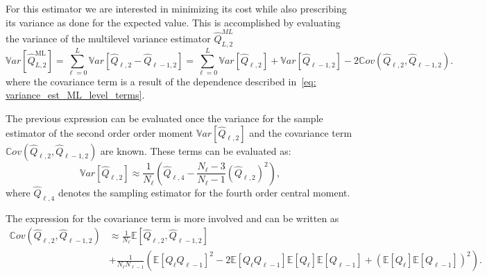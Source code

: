 For this estimator we are interested in minimizing its cost while also prescribing its variance as done for the expected value. This is accomplished by evaluating the 
variance of the multilevel variance estimator $\hat{Q}_{L,2}^{ML}$
\begin{equation}
 \mathbb{V}ar\left[ \hat{Q}_{L,2}^{\mathrm{ML}} \right] = \sum_{\ell=0}^L \mathbb{V}ar\left[ \hat{Q}_{\ell,2} - \hat{Q}_{\ell-1,2} \right]
                                               = \sum_{\ell=0}^L \mathbb{V}ar\left[ \hat{Q}_{\ell,2} \right] + \mathbb{V}ar\left[\hat{Q}_{\ell-1,2} \right]
                                               - 2 \mathbb{C}ov\left( \hat{Q}_{\ell,2},\hat{Q}_{\ell-1,2} \right).
\end{equation}
where the covariance term is a result of the dependence described in~\eqref{eq: variance_est_ML_level_terms}.

The previous expression can be evaluated once the variance for the sample estimator of the second order order moment $\mathbb{V}ar\left[ \hat{Q}_{\ell,2} \right]$ and the covariance term $\mathbb{C}ov\left( \hat{Q}_{\ell,2},\hat{Q}_{\ell-1,2} \right)$ are known. These terms can be evaluated as:
\begin{equation}
 \mathbb{V}ar\left[ \hat{Q}_{\ell,2} \right] \approx \frac{1}{N_\ell} \left( \hat{Q}_{\ell,4} - \frac{N_\ell-3}{N_\ell-1} \left(\hat{Q}_{\ell,2}\right)^2 \right),
\end{equation}
where $\hat{Q}_{\ell,4}$ denotes the sampling estimator for the fourth order central moment.

The expression for the covariance term is more involved and can be written as
\begin{equation}
\begin{split}
 \mathbb{C}ov\left( \hat{Q}_{\ell,2},\hat{Q}_{\ell-1,2} \right) &\approx \frac{1}{N_\ell} \mathbb{E}\left[ \hat{Q}_{\ell,2},\hat{Q}_{\ell-1,2} \right] \\
                                                                      &+ \frac{1}{N_\ell N_{\ell-1}} \left( \mathbb{E}\left[ Q_\ell Q_{\ell-1} \right]^2
                                                                      - 2  \mathbb{E}\left[ Q_\ell Q_{\ell-1} \right] \mathbb{E}\left[ Q_\ell \right] \mathbb{E}\left[Q_{\ell-1} \right] + \left( \mathbb{E}\left[ Q_\ell \right] \mathbb{E}\left[Q_{\ell-1} \right] \right)^2
                                                                      \right).
\end{split}
\end{equation}

